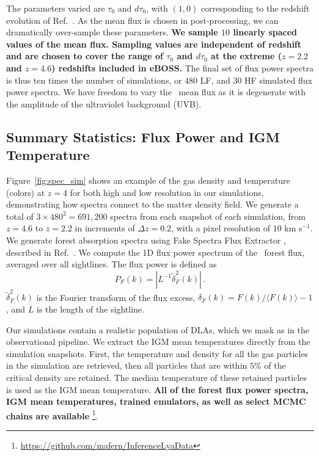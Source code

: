 The parameters varied are $\tau_0$ and $d\tau_0$, with $(1, 0)$ corresponding to the redshift evolution of Ref.~\cite{2007MNRAS.382.1657K}.
As the mean flux is chosen in post-processing, we can dramatically over-sample these parameters. \textbf{We sample $10$ linearly spaced values of the mean flux. Sampling values are independent of redshift and are chosen to cover the range of $\tau_0$ and $d\tau_0$ at the extreme ($z=2.2$ and $z=4.6$) redshifts included in eBOSS.}
The final set of flux power spectra is thus ten times the number of simulations, or $480$ LF, and $30$ HF simulated flux power spectra.
We have freedom to vary the \Lya~mean flux as it is degenerate with the amplitude of the ultraviolet background (UVB). 


\subsection{Summary Statistics: Flux Power and IGM Temperature}\label{sec:sim_fps}

Figure~\ref{fig:spec_sim} shows an example of the gas density and temperature (colors) at $z=4$ for both high and low resolution in our simulations, demonstrating how spectra connect to the matter density field.
We generate a total of $3\times 480^2 = 691,200$ spectra from each snapshot of each simulation, from $z=4.6$ to $z=2.2$ in increments of $\Delta z=0.2$, with a pixel resolution of $10$ km s$^{-1}$.
We generate \lya forest absorption spectra using Fake Spectra Flux Extractor \cite{2017ascl.soft10012B}\footnotemark, described in Ref.~\cite{2015MNRAS.447.1834B}.
We compute the 1D flux power spectrum of the \Lya~forest flux, averaged over all sightlines.
The flux power is defined as 
\begin{equation}
 P_F(k) = |L^{-1}\tilde{\delta}^2_F(k)|\,.   
\end{equation}
$\tilde{\delta}^2_F(k)$ is the Fourier transform of the flux excess, $\delta_F(k) = F(k)/\langle F(k) \rangle - 1$, and $L$ is the length of the sightline. 

Our simulations contain a realistic population of DLAs, which we mask as in the observational pipeline.
We extract the IGM mean temperatures directly from the simulation snapshots.
First, the temperature and density for all the gas particles in the simulation are retrieved, then all particles that are within $5\%$ of the critical density are retained.
The median temperature of these retained particles is used as the IGM mean temperature.
\textbf{All of the \lya forest flux power spectra, IGM mean temperatures, trained emulators, as well as select MCMC chains are available} \footnote{\url{https://github.com/mafern/InferenceLyaData}}.

